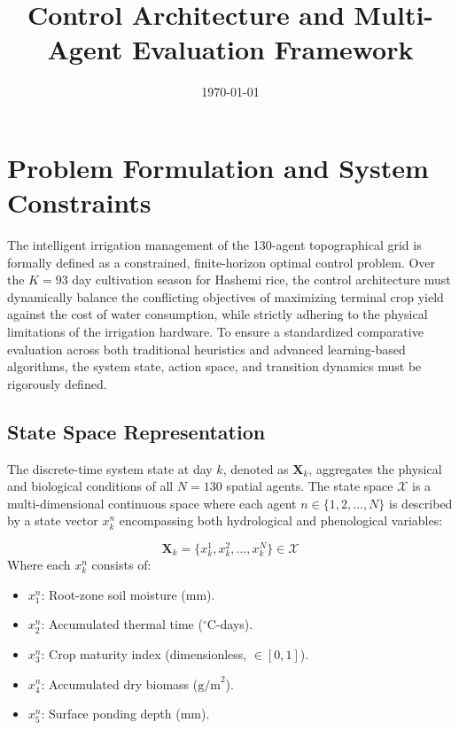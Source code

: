\documentclass[11pt, a4paper]{article}
\title{\textbf{Control Architecture and Multi-Agent Evaluation Framework}}
\author{} %
\date{\today}
\begin{document}
\maketitle

\section{Problem Formulation and System Constraints}

The intelligent irrigation management of the 130-agent topographical grid is formally defined as a constrained, finite-horizon optimal control problem. Over the $K = 93$ day cultivation season for Hashemi rice, the control architecture must dynamically balance the conflicting objectives of maximizing terminal crop yield against the cost of water consumption, while strictly adhering to the physical limitations of the irrigation hardware. To ensure a standardized comparative evaluation across both traditional heuristics and advanced learning-based algorithms, the system state, action space, and transition dynamics must be rigorously defined.

\subsection{State Space Representation}

The discrete-time system state at day $k$, denoted as $\mathbf{X}_k$, aggregates the physical and biological conditions of all $N = 130$ spatial agents. The state space $\mathcal{X}$ is a multi-dimensional continuous space where each agent $n \in \{1, 2, \dots, N\}$ is described by a state vector $x^n_k$ encompassing both hydrological and phenological variables:

\begin{equation}
    \mathbf{X}_k = \{x_k^1, x_k^2, \dots, x_k^N\} \in \mathcal{X}
\end{equation}
Where each $x^n_k$ consists of:
\begin{itemize}
    \item $x_1^n$: Root-zone soil moisture (mm).
    \item $x_2^n$: Accumulated thermal time ($^\circ$C-days).
    \item $x_3^n$: Crop maturity index (dimensionless, $\in [0, 1]$).
    \item $x_4^n$: Accumulated dry biomass ($\text{g/m}^2$).
    \item $x_5^n$: Surface ponding depth (mm).
\end{itemize}
\end{document}
